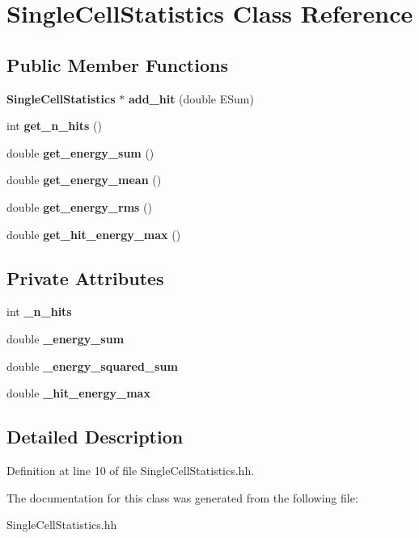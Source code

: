\section{SingleCellStatistics Class Reference}
\label{classSingleCellStatistics}
\subsection*{Public Member Functions}
\begin{DoxyCompactItemize}
\item 
{\bf SingleCellStatistics} $\ast$ {\bfseries add\_\-hit} (double ESum)\label{classSingleCellStatistics_a6a56d2dc810b72a4e5b4ded0422f8199}

\item 
int {\bfseries get\_\-n\_\-hits} ()\label{classSingleCellStatistics_aba90a0ea0bee6c636e3b369bd4338b06}

\item 
double {\bfseries get\_\-energy\_\-sum} ()\label{classSingleCellStatistics_aff5d2589b7c310995b2866e22f1def7e}

\item 
double {\bfseries get\_\-energy\_\-mean} ()\label{classSingleCellStatistics_ac921eb395cba1336b676ada1c9d15772}

\item 
double {\bfseries get\_\-energy\_\-rms} ()\label{classSingleCellStatistics_a7a72f85e2a683197655dc1bc1bea68d2}

\item 
double {\bfseries get\_\-hit\_\-energy\_\-max} ()\label{classSingleCellStatistics_aba089759ba105f50be7a4f21902f318f}

\end{DoxyCompactItemize}
\subsection*{Private Attributes}
\begin{DoxyCompactItemize}
\item 
int {\bfseries \_\-n\_\-hits}\label{classSingleCellStatistics_a518a9edb2a31a08301e08adaf9a8b41a}

\item 
double {\bfseries \_\-energy\_\-sum}\label{classSingleCellStatistics_a3a38fb073934aef88f90bf0a2257f235}

\item 
double {\bfseries \_\-energy\_\-squared\_\-sum}\label{classSingleCellStatistics_aeb92f74c92dae3392d08c160a5dbe252}

\item 
double {\bfseries \_\-hit\_\-energy\_\-max}\label{classSingleCellStatistics_a3bd8c04ddf2ce3aa47196220480c3a5a}

\end{DoxyCompactItemize}


\subsection{Detailed Description}


Definition at line 10 of file SingleCellStatistics.hh.

The documentation for this class was generated from the following file:\begin{DoxyCompactItemize}
\item 
SingleCellStatistics.hh\end{DoxyCompactItemize}
